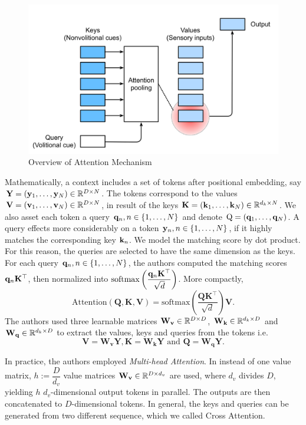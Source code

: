 \begin{figure}[ht]
  \centering
  \includegraphics[width=0.75\linewidth]{img/attention.png}
  \vspace{0.25cm}
  \caption[Overview of Attention Mechanism]{Overview of Attention Mechanism \cite{zhang2023dive}}
  \label{figure:attention}
\end{figure}

Mathematically, a context includes a set of tokens after positional embedding, say $\mathbf{Y}=(\mathbf{y}_1,\ldots, \mathbf{y}_N)\in\mathbb{R}^{D\times N}$. The tokens correspond to the values $\mathbf{V}=(\mathbf{v}_1,\ldots, \mathbf{v}_N)\in\mathbb{R}^{D\times N}$, in result of the keys $\mathbf{K}=(\mathbf{k}_1,\ldots, \mathbf{k}_N)\in\mathbb{R}^{d_k\times N}$. We also asset each token a query $\mathbf{q}_n, n\in\{1,\ldots,N\}$ and denote $\mathrm{Q} = (\mathbf{q}_1,\ldots, \mathbf{q}_N)$. A query effects more considerably on a token $\mathbf{y}_n, n\in\{1,\ldots,N\}$, if it highly matches the corresponding key $\mathbf{k}_n$. We model the matching score by dot product. For this reason, the queries are selected to have the same dimension as the keys. For each query $\mathbf{q}_n, n\in\{1,\ldots,N\}$, the authors computed the matching scores $\mathbf{q}_n \mathbf{K}^\top$, then normalized into $\mathrm{softmax}\left(\dfrac{\mathbf{q}_n\mathbf{K}^\top}{\sqrt{d}}\right)$.
More compactly,
\begin{equation}
  \mathrm{Attention}(\mathbf{Q}, \mathbf{K}, \mathbf{V}) = \mathrm{softmax}\left(\dfrac{\mathbf{Q}\mathbf{K}^\top}{\sqrt{d}}\right)\mathbf{V}.
\end{equation}
The authors used three learnable matrices $\mathbf{W_v}\in \mathbb{R}^{D\times D}$, $\mathbf{W_k}\in \mathbb{R}^{d_k\times D}$ and  $\mathbf{W_q}\in \mathbb{R}^{d_k\times D}$ to extract the values, keys and queries from the tokens i.e.
$$\mathbf{V} = \mathbf{W_v}\mathbf{Y}, \mathbf{K} = \mathbf{W_k}\mathbf{Y} \text{ and } \mathbf{Q} = \mathbf{W_q}\mathbf{Y}.$$

In practice, the authors employed \textit{Multi-head Attention}. In instead of one value matrix, $h:=\dfrac{D}{d_v}$ value matrices $\mathbf{W_v}\in \mathbb{R}^{D\times d_v}$ are used, where $d_v$ divides $D$, yielding $h$ $d_v$-dimensional output tokens in parallel. The outputs are then concatenated to $D$-dimensional tokens. In general, the keys and queries can be generated from two different sequence, which we called Cross Attention.

